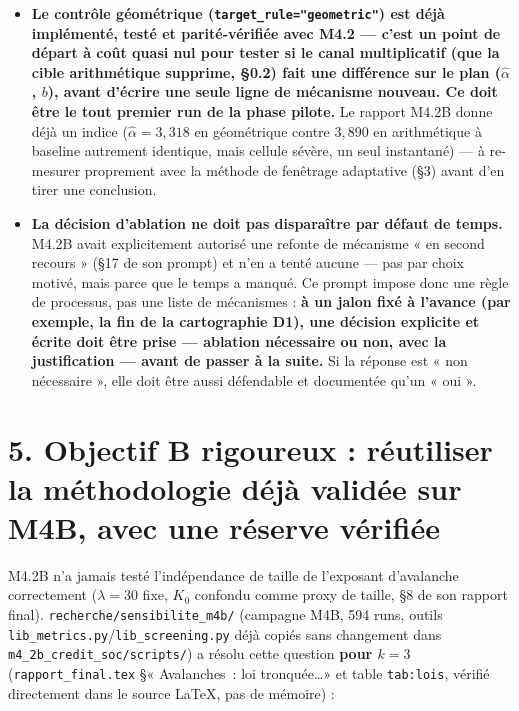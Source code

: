 \documentclass[11pt,a4paper]{article}
\newcommand{\code}[1]{\texttt{#1}}
\begin{document}
\begin{itemize}
\item \textbf{Le contrôle géométrique
  (\code{target\_rule="geometric"}) est déjà implémenté, testé et
  parité-vérifiée avec M4.2 --- c'est un point de départ à coût quasi
  nul pour tester si le canal multiplicatif (que la cible arithmétique
  supprime, \S0.2) fait une différence sur le plan ($\hat\alpha$,
  $b$), avant d'écrire une seule ligne de mécanisme nouveau. Ce doit
  être le tout premier run de la phase pilote.} Le rapport M4.2B
  donne déjà un indice ($\hat\alpha=3{,}318$ en géométrique contre
  $3{,}890$ en arithmétique à baseline autrement identique, mais
  cellule sévère, un seul instantané) --- à re-mesurer proprement avec
  la méthode de fenêtrage adaptative (\S3) avant d'en tirer une
  conclusion.
\item \textbf{La décision d'ablation ne doit pas disparaître par
  défaut de temps.} M4.2B avait explicitement autorisé une refonte de
  mécanisme « en second recours » (\S17 de son prompt) et n'en a
  tenté aucune --- pas par choix motivé, mais parce que le temps a
  manqué. Ce prompt impose donc une règle de processus, pas une liste
  de mécanismes : \textbf{à un jalon fixé à l'avance (par exemple, la
  fin de la cartographie D1), une décision explicite et écrite doit
  être prise --- ablation nécessaire ou non, avec la justification ---
  avant de passer à la suite.} Si la réponse est « non nécessaire »,
  elle doit être aussi défendable et documentée qu'un « oui ».
\end{itemize}

\section*{5. Objectif B rigoureux : réutiliser la méthodologie déjà validée sur M4B, avec une réserve vérifiée}

M4.2B n'a jamais testé l'indépendance de taille de l'exposant
d'avalanche correctement ($\lambda=30$ fixe, $K_0$ confondu comme
proxy de taille, \S8 de son rapport final). \code{recherche/sensibilite\_m4b/}
(campagne M4B, 594 runs, outils \code{lib\_metrics.py}/\code{lib\_screening.py}
déjà copiés sans changement dans \code{m4\_2b\_credit\_soc/scripts/}) a
résolu cette question \textbf{pour $k=3$} (\code{rapport\_final.tex}
\S« Avalanches~: loi tronquée\ldots » et table \code{tab:lois},
vérifié directement dans le source \LaTeX{}, pas de mémoire) :
\end{document}
